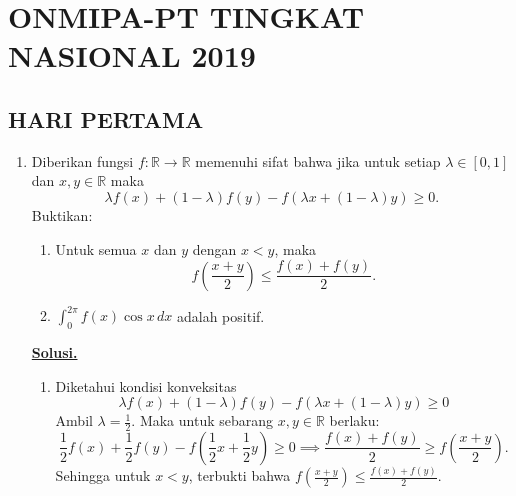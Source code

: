 \documentclass[12pt,twoside]{article}
\newenvironment{solution}
{
	\par\noindent\textbf{\underline{Solusi.}}\\
}
{
	\par
}
\begin{document}
\pagebreak

\section{ONMIPA-PT TINGKAT NASIONAL 2019}
\subsection{HARI PERTAMA}
\begin{enumerate}
  \item Diberikan fungsi $f : \mathbb{R} \to \mathbb{R}$ memenuhi sifat bahwa jika untuk setiap $\lambda \in [0,1]$ dan $x, y \in \mathbb{R}$ maka
        \[
          \lambda f(x) + (1 - \lambda) f(y) - f(\lambda x + (1 - \lambda)y) \geq 0.
        \]
        Buktikan:
        \begin{enumerate}
          \item Untuk semua $x$ dan $y$ dengan $x < y$, maka
                \[
                  f\left( \frac{x + y}{2} \right) \leq \frac{f(x) + f(y)}{2}.
                \]
          \item
                \(       \displaystyle \int_{0}^{2\pi} f(x) \cos x \, dx \)  adalah positif.
        \end{enumerate}

        \begin{solution}
          \begin{enumerate}
            \item Diketahui kondisi konveksitas
                  \[ \lambda f(x) + (1 - \lambda) f(y) - f(\lambda x + (1 - \lambda)y) \ge 0 \]
                  Ambil $\lambda = \frac{1}{2}$. Maka untuk sebarang $x, y \in \mathbb{R}$ berlaku:
                  \[ \frac{1}{2} f(x) + \frac{1}{2} f(y) - f\left(\frac{1}{2} x + \frac{1}{2}y\right) \ge 0 \implies \frac{f(x) + f(y)}{2} \ge f\left(\frac{x+y}{2}\right). \]
                  Sehingga untuk $x < y$, terbukti bahwa $f\left( \frac{x + y}{2} \right) \le \frac{f(x) + f(y)}{2}$.


\end{enumerate}
\end{solution}
\end{enumerate}
\end{document}
